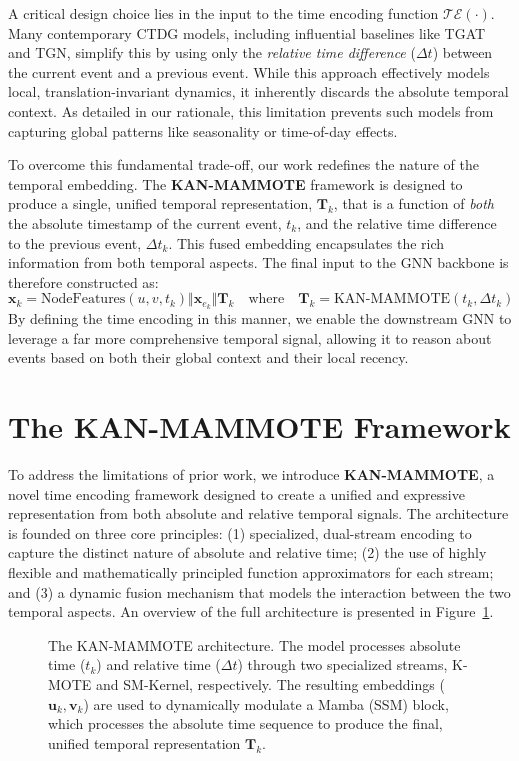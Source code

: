 \documentclass{article}
\begin{document}
A critical design choice lies in the input to the time encoding function $\mathcal{TE}(\cdot)$. Many contemporary CTDG models, including influential baselines like TGAT and TGN, simplify this by using only the \textit{relative time difference} ($\Delta t$) between the current event and a previous event. While this approach effectively models local, translation-invariant dynamics, it inherently discards the absolute temporal context. As detailed in our rationale, this limitation prevents such models from capturing global patterns like seasonality or time-of-day effects.

To overcome this fundamental trade-off, our work redefines the nature of the temporal embedding. The \textbf{KAN-MAMMOTE} framework is designed to produce a single, unified temporal representation, $\mathbf{T}_k$, that is a function of \textit{both} the absolute timestamp of the current event, $t_k$, and the relative time difference to the previous event, $\Delta t_k$. This fused embedding encapsulates the rich information from both temporal aspects. The final input to the GNN backbone is therefore constructed as:
\begin{equation}
\mathbf{x}_k = \text{NodeFeatures}(u, v, t_k) \Vert \mathbf{x}_{e_k} \Vert \mathbf{T}_k \quad \text{where} \quad \mathbf{T}_k = \text{KAN-MAMMOTE}(t_k, \Delta t_k)
\end{equation}
By defining the time encoding in this manner, we enable the downstream GNN to leverage a far more comprehensive temporal signal, allowing it to reason about events based on both their global context and their local recency.
\section{The KAN-MAMMOTE Framework}

To address the limitations of prior work, we introduce \textbf{KAN-MAMMOTE}, a novel time encoding framework designed to create a unified and expressive representation from both absolute and relative temporal signals. The architecture is founded on three core principles: (1) specialized, dual-stream encoding to capture the distinct nature of absolute and relative time; (2) the use of highly flexible and mathematically principled function approximators for each stream; and (3) a dynamic fusion mechanism that models the interaction between the two temporal aspects. An overview of the full architecture is presented in Figure~\ref{fig:kan-mammote-architecture}.

\begin{figure}[h!]
    \centering
    \caption{The KAN-MAMMOTE architecture. The model processes absolute time ($t_k$) and relative time ($\Delta t$) through two specialized streams, K-MOTE and SM-Kernel, respectively. The resulting embeddings ($\mathbf{u}_k, \mathbf{v}_k$) are used to dynamically modulate a Mamba (SSM) block, which processes the absolute time sequence to produce the final, unified temporal representation $\mathbf{T}_k$.}
    \label{fig:kan-mammote-architecture}
\end{figure}
\end{document}
